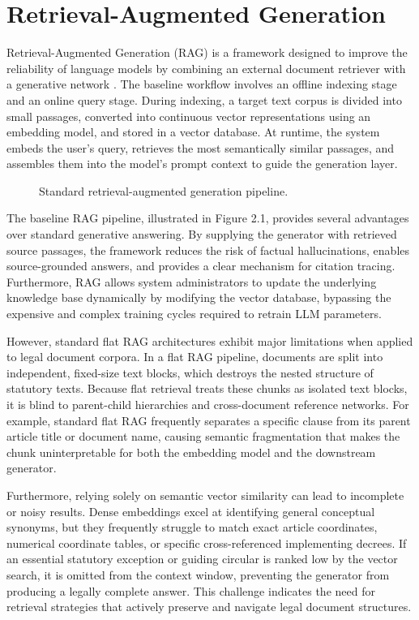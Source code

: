 \section{Retrieval-Augmented Generation}
Retrieval-Augmented Generation (RAG) is a framework designed to improve the reliability of language models by combining an external document retriever with a generative network \cite{lewis2020retrieval}. The baseline workflow involves an offline indexing stage and an online query stage. During indexing, a target text corpus is divided into small passages, converted into continuous vector representations using an embedding model, and stored in a vector database. At runtime, the system embeds the user's query, retrieves the most semantically similar passages, and assembles them into the model's prompt context to guide the generation layer.

\begin{figure}[htbp]
  \centering
  \resizebox{0.95\textwidth}{!}{}
  \caption{Standard retrieval-augmented generation pipeline.}
  \label{fig:standard-rag-pipeline}
\end{figure}

The baseline RAG pipeline, illustrated in Figure 2.1, provides several advantages over standard generative answering. By supplying the generator with retrieved source passages, the framework reduces the risk of factual hallucinations, enables source-grounded answers, and provides a clear mechanism for citation tracing. Furthermore, RAG allows system administrators to update the underlying knowledge base dynamically by modifying the vector database, bypassing the expensive and complex training cycles required to retrain LLM parameters.

However, standard flat RAG architectures exhibit major limitations when applied to legal document corpora. In a flat RAG pipeline, documents are split into independent, fixed-size text blocks, which destroys the nested structure of statutory texts. Because flat retrieval treats these chunks as isolated text blocks, it is blind to parent-child hierarchies and cross-document reference networks. For example, standard flat RAG frequently separates a specific clause from its parent article title or document name, causing semantic fragmentation that makes the chunk uninterpretable for both the embedding model and the downstream generator.

Furthermore, relying solely on semantic vector similarity can lead to incomplete or noisy results. Dense embeddings excel at identifying general conceptual synonyms, but they frequently struggle to match exact article coordinates, numerical coordinate tables, or specific cross-referenced implementing decrees. If an essential statutory exception or guiding circular is ranked low by the vector search, it is omitted from the context window, preventing the generator from producing a legally complete answer. This challenge indicates the need for retrieval strategies that actively preserve and navigate legal document structures.

